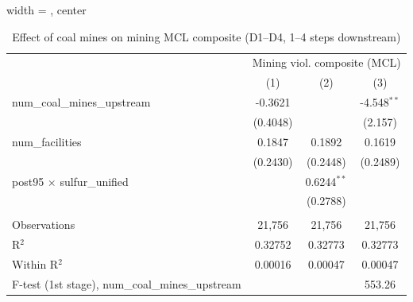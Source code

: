 
\begin{table}[htbp]
   
   \caption{\label{2sls_4step_d1_d4_mining_mcl_composite} Effect of coal mines on mining MCL composite (D1--D4, 1--4 steps downstream)}
   \bigskip
   
   \centering
   
   \begin{adjustbox}{width = \textwidth, center}
      
      
      \begin{tabular}{lccc}
         \toprule
         
          & \multicolumn{3}{c}{Mining viol. composite (MCL)}\\
         
                                                           & (1)           & (2)           & (3)\\  
         
         \midrule 
         num\_coal\_mines\_upstream                        & -0.3621       &               & -4.548$^{**}$\\   
                                                           & (0.4048)      &               & (2.157)\\   
         num\_facilities                                   & 0.1847        & 0.1892        & 0.1619\\   
                                                           & (0.2430)      & (0.2448)      & (0.2489)\\   
         post95 $\times$ sulfur\_unified                   &               & 0.6244$^{**}$ &   \\   
                                                           &               & (0.2788)      &   \\   
         
          \\
         
         Observations                                      & 21,756        & 21,756        & 21,756\\  
         R$^2$                                             & 0.32752       & 0.32773       & 0.32773\\  
         Within R$^2$                                      & 0.00016       & 0.00047       & 0.00047\\  
         F-test (1st stage), num\_coal\_mines\_upstream    &               &               & 553.26\\  
         

\end{tabular}
\end{adjustbox}
\end{table}
